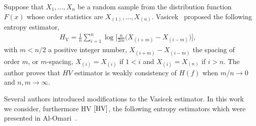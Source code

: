 \documentclass[journal]{IEEEtran}
\begin{document}
Suppose that $X_1,\dots,X_n$ be a random sample from the distribution function $F(x)$ whose order statistics are $X_{(1)}, \ldots, X_{(n)}$. 
Vasicek~\cite{Vasicek76} proposed the following entropy estimator,
\begin{align}
	\label{HV}
	H_{\text{V}}=\frac{1}{n} \sum_{i=1}^{n} \log \Big[\frac{n}{2 m}\big(X_{(i+m)}-X_{(i-m)}\big)\Big], 
\end{align}
with $m<n/2$ a positive integer number, $X_{(i+m)}-X_{(i-m)}$ the spacing of order $m$, or $m$-spacing, $X_{(i)}=X_{(i)}$ if $1<i$ and $X_{(i)}=X_{(n)}$ if $i>n$.
The author proves that $HV$ estimator is weakly consistency of $H(f)$ when $m/n \to 0$ and $n,m \to \infty$.

Several authors introduced modifications to the Vasicek estimator. In this work we consider, furthermore HV$~\eqref{HV}$,  the following entropy estimators which were presented in Al-Omari~\cite{AlOmari2016}. 
\end{document}
